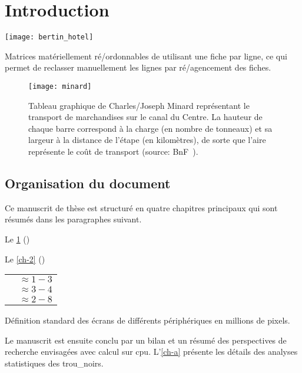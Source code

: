 
\chapter{Introduction}
\label{ch-1}

\lipsum[2-4]

\begin{marginfigure}
	\texttt{[image: bertin\_hotel]}
	\caption[Matrices ré\-/ordonnables de Jacques Bertin.]{Matrices matériellement ré\-/ordonnables de  \citet{bertin_la_1977} utilisant une fiche par ligne, ce qui permet de reclasser manuellement les lignes par ré\-/agencement des fiches.}	
	\label{fig-bertin-matrice}
\end{marginfigure}

\lipsum[3]

\begin{figure*}[t]
	\centering
	\texttt{[image: minard]}
	\caption[Tableau graphique de Charles\-/Joseph Minard.]{Tableau graphique de Charles\-/Joseph Minard représentant le transport de marchandises sur le canal du Centre. La hauteur de chaque barre correspond à la charge (en nombre de tonneaux) et sa largeur à la distance de l'étape (en kilomètres), de sorte que l'aire représente le coût de transport (source: BnF~\citep{minard_des_1862}).}
	\label{fig-minard}
\end{figure*}

\lipsum[2]

\section*{Organisation du document}
Ce manuscrit de thèse est structuré en quatre chapitres principaux qui sont résumés dans les paragraphes suivant. 

Le \cref{ch-1} () \lipsum[1]

Le \cref{ch-2} () \lipsum[1]

\begin{margintable}
	\footnotesize
	\setlength\tabcolsep{.8pt} %
	\begin{tabularx}{.95\marginparwidth}{Xl}
		\toprule
		& \thead{définition} \\
		\midrule
		{\faMobile*} & $ \approx 1-3$  \\
		{\faTablet*} & $ \approx 3-4$  \\
		{\faTv}   & $ \approx 2-8$ \\
		
		\bottomrule
	\end{tabularx}
	\caption{Définition standard des écrans de différents périphériques en millions de pixels.}
	\label{tab-ecrans}
\end{margintable}

Le manuscrit est ensuite conclu par un bilan et un résumé des perspectives de recherche envisagées avec calcul sur \gls{cpu}. L'\cref{ch-a} présente les détails des analyses statistiques des \glspl{trou_noir}.
